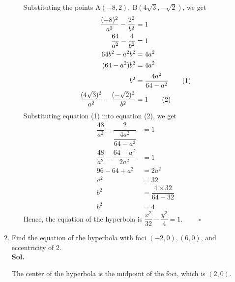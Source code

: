 \documentclass{report}
\newcommand{\sol}{\vspace{1em}\\\textbf{Sol.}}
\newcommand{\eos}{ \qquad \square}
\newcommand\numberthis{\addtocounter{equation}{1}\tag{\theequation}}
\begin{document}
\begin{enumerate}[leftmargin=*]
\begin{enumerate}
                    Substituting the points $\mathrm{A}(-8,2), \mathrm{~B}(4 \sqrt{3},-\sqrt{2})$,
                    we get
                    \begin{align*}
                        \dfrac{(-8)^2}{a^2}-\dfrac{2^2}{b^2}                   & =1                                 \\
                        \dfrac{64}{a^2}-\dfrac{4}{b^2}                         & =1                                 \\
                        64b^2-a^2b^2                                           & = 4a^2                             \\
                        (64-a^2)b^2                                            & = 4a^2                             \\
                        b^2                                                    & = \dfrac{4a^2}{64-a^2} \numberthis \\
                        \dfrac{(4 \sqrt{3})^2}{a^2}-\dfrac{(-\sqrt{2})^2}{b^2} & =1 \numberthis
                    \end{align*}
                    Substituting equation (1) into equation (2), we get
                    \begin{align*}
                        \dfrac{48}{a^2}-\dfrac{2}{\dfrac{4a^2}{64-a^2}} & =1                           \\
                        \dfrac{48}{a^2}-\dfrac{64-a^2}{2a^2}            & =1                           \\
                        96-64+a^2                                       & =2a^2                        \\
                        a^2                                             & = 32                         \\
                        b^2                                             & = \dfrac{4 \times 32}{64-32} \\
                        b^2                                             & = 4
                    \end{align*}
                    Hence, the equation of the hyperbola is $\dfrac{x^2}{32}-\dfrac{y^2}{4}=1$. $\eos$
          \end{enumerate}

    \item Find the equation of the hyperbola with foci $(-2,0), (6,0)$, and eccentricity
          of 2. \sol{}

          The center of the hyperbola is the midpoint of the foci, which is $(2,0)$.


\end{enumerate}
\end{document}
